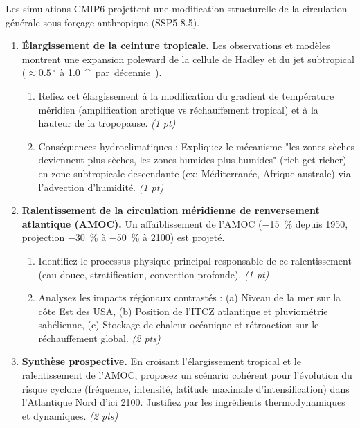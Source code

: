 \documentclass[11pt]{article}
\providecommand{\degree}{^{\circ}}
\begin{document}
\begin{exercice}
\label{exo:cc_flux}
Les simulations CMIP6 projettent une modification structurelle de la circulation générale sous forçage anthropique (SSP5-8.5).

\begin{enumerate}
    \item \textbf{Élargissement de la ceinture tropicale.} Les observations et modèles montrent une expansion poleward de la cellule de Hadley et du jet subtropical ($\approx \SI{0.5}{\degree}$ à \SI{1.0}{\degree} par décennie).
    \begin{enumerate}
        \item Reliez cet élargissement à la modification du gradient de température méridien (amplification arctique vs réchauffement tropical) et à la hauteur de la tropopause. \textit{(1 pt)}
        \item Conséquences hydroclimatiques : Expliquez le mécanisme "les zones sèches deviennent plus sèches, les zones humides plus humides" (rich-get-richer) en zone subtropicale descendante (ex: Méditerranée, Afrique australe) via l'advection d'humidité. \textit{(1 pt)}
    \end{enumerate}

    \item \textbf{Ralentissement de la circulation méridienne de renversement atlantique (AMOC).} Un affaiblissement de l'AMOC (\SI{-15}{\%} depuis 1950, projection \SI{-30}{\%} à \SI{-50}{\%} à 2100) est projeté.
    \begin{enumerate}
        \item Identifiez le processus physique principal responsable de ce ralentissement (eau douce, stratification, convection profonde). \textit{(1 pt)}
        \item Analysez les impacts régionaux contrastés : (a) Niveau de la mer sur la côte Est des USA, (b) Position de l'ITCZ atlantique et pluviométrie sahélienne, (c) Stockage de chaleur océanique et rétroaction sur le réchauffement global. \textit{(2 pts)}
    \end{enumerate}

    \item \textbf{Synthèse prospective.} En croisant l'élargissement tropical et le ralentissement de l'AMOC, proposez un scénario cohérent pour l'évolution du risque cyclone (fréquence, intensité, latitude maximale d'intensification) dans l'Atlantique Nord d'ici 2100. Justifiez par les ingrédients thermodynamiques et dynamiques. \textit{(2 pts)}
\end{enumerate}
\end{exercice}
\end{document}
